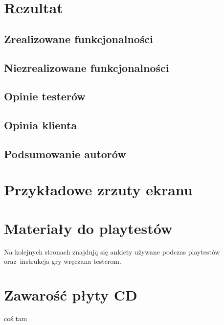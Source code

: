 \documentclass[licencjacka]{pracamgr}
\begin{document}
\chapter{Rezultat}

  \section{Zrealizowane funkcjonalności}

  \section{Niezrealizowane funkcjonalności}

  \section{Opinie testerów}

  \section{Opinia klienta}
  
  \section{Podsumowanie autorów}

\appendix

  \chapter{Przykładowe zrzuty ekranu}

  \chapter{Materiały do playtestów}
  Na kolejnych stronach znajdują się ankiety używane podczas playtestów
  oraz~instrukcja gry wręczana testerom.

    
    
    

  \chapter{Zawarość płyty CD}


\begin{thebibliography}{99}

  \item{coś tam}

\end{thebibliography}
\end{document}
